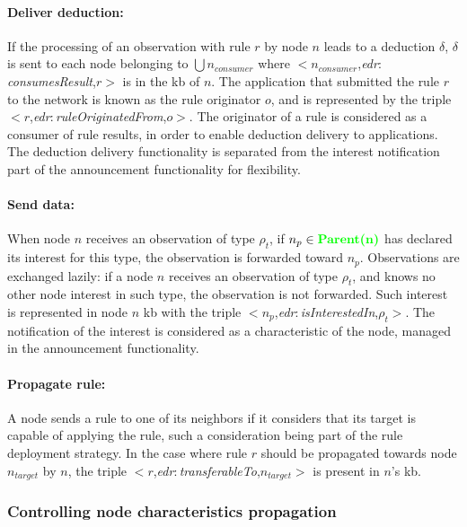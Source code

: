 \documentclass{iosart2c}
\newcommand{\added}[1]{\textcolor{green}{\textbf{#1}}}
\newcommand{\namespace}[1]{\textit{#1$:$}}
\newcommand{\concept}[2]{\namespace{#1}\-\textit{#2}}
\newcommand{\triplet}[3]{$<$#1,\textit{#2},#3$>$}
\begin{document}
\paragraph{Deliver deduction:}
\label{par:deduction_delivery}
If the processing of an observation with rule $r$ by node $n$ leads to a deduction $\delta$, $\delta$ is sent to each node belonging to $\bigcup n_{consumer}$ where \triplet{$n_{consumer}$}{\concept{edr}{consumes\-Result}}{$r$} is in the \gls{kb} of $n$.
The application that submitted the rule $r$ to the network is known as the rule originator $o$, and is represented by the triple \triplet{$r$}{\concept{edr}{rule\-Originated\-From}}{$o$}.
The originator of a rule is considered as a consumer of rule results, in order to enable deduction delivery to applications.
The deduction delivery functionality is separated from the interest notification part of the announcement functionality for flexibility.

\paragraph{Send data:}
\label{par:data_transfer}
When node $n$ receives an observation of type $\rho_t$, if $n_p \in \added{Parent(n)}$ has declared its interest for this type, the observation is forwarded toward $n_{p}$.
Observations are exchanged lazily: if a node $n$ receives an observation of type $\rho_t$, and knows no other node interest in such type, the observation is not forwarded.
Such interest is represented in node $n$ \gls{kb} with the triple \triplet{$n_{p}$}{\concept{edr}{is\-Interested\-In}}{$\rho_t$}.
The notification of the interest is considered as a characteristic of the node, managed in the announcement functionality.

\paragraph{Propagate rule:}
\label{par:send_rule}
A node sends a rule to one of its neighbors if it considers that its target is capable of applying the rule, such a consideration being part of the rule deployment strategy. 
In the case where rule $r$ should be propagated towards node $n_{target}$ by $n$, the triple \triplet{$r$}{\concept{edr}{transferable\-To}}{$n_{target}$} is present in $n$'s \gls{kb}.

\subsubsection{Controlling node characteristics propagation}
\label{subsubs:annouce}
\end{document}
